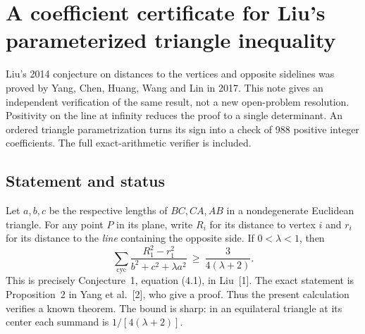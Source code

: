 \documentclass[11pt,a4paper]{article}
\numberwithin{equation}{section}
\theoremstyle{definition}
\theoremstyle{remark}
\newenvironment{sectionabstract}{\par\smallskip\begingroup\small\noindent}{\par\endgroup\medskip}
\begin{document}
\par\endgroup

\begingroup
\newcommand{\cyc}{\mathrm{cyc}}
\section{\texorpdfstring{A coefficient certificate for Liu's parameterized triangle inequality}{A coefficient certificate for Liu's parameterized triangle inequality}}\label{section:r28meiji}
\par\medskip


\begin{sectionabstract}
Liu's 2014 conjecture on distances to the vertices and opposite sidelines
was proved by Yang, Chen, Huang, Wang and Lin in 2017. This note gives
an independent verification of the same result, not a new open-problem
resolution. Positivity on the line at infinity reduces the proof to a
single determinant. An ordered triangle parametrization turns its sign
into a check of 988 positive integer coefficients. The full
exact-arithmetic verifier is included.
\end{sectionabstract}
\subsection*{Statement and status}
Let $a,b,c$ be the respective lengths of $BC,CA,AB$ in a nondegenerate
Euclidean triangle. For any point $P$ in its plane, write $R_i$ for
its distance to vertex $i$ and $r_i$ for its distance to the
\emph{line} containing the opposite side. If $0<\lambda<1$, then
\begin{equation}
 \sum_{\cyc}\frac{R_1^2-r_1^2}{b^2+c^2+\lambda a^2}
 \ \geq\ \frac{3}{4(\lambda+2)}. \label{r28meiji:goal}
\end{equation}
This is precisely Conjecture~1, equation (4.1), in Liu~[1]. The exact
statement is Proposition~2 in Yang et al.~[2], who give a proof.
Thus the present calculation verifies a known theorem.
The bound is sharp: in an equilateral triangle at its center each
summand is $1/[4(\lambda+2)]$.
\end{document}
